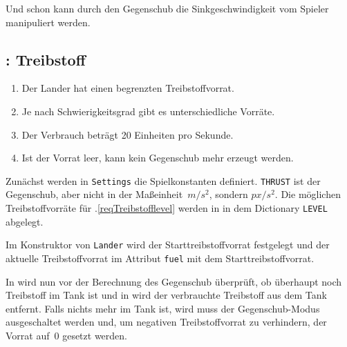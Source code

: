 
Und schon kann durch den Gegenschub die Sinkgeschwindigkeit vom Spieler manipuliert werden.

\subsection{: Treibstoff}

\begin{enumerate}
	\item Der Lander hat einen begrenzten Treibstoffvorrat.\label{reqTreibstoffvorrat}
	\item Je nach Schwierigkeitsgrad gibt es unterschiedliche Vorräte.\label{reqTreibstofflevel}
	\item Der Verbrauch beträgt 20 Einheiten pro Sekunde.\label{reqTreibstoffverbrauch}
	\item Ist der Vorrat leer, kann kein Gegenschub mehr erzeugt werden.\label{reqTreibstoffende}
\end{enumerate}
\er

Zunächst werden in \texttt{Settings} die Spielkonstanten definiert. \texttt{THRUST} ist der Gegenschub, aber nicht in der Maßeinheit~$\unit{m/s^2}$, sondern $\unit{px/s^2}$. Die möglichen Treibstoffvorräte für .\ref{reqTreibstofflevel} werden in  in dem Dictionary \texttt{LEVEL} abgelegt.



Im Konstruktor von \texttt{Lander} wird der Starttreibstoffvorrat festgelegt und der aktuelle Treibstoffvorrat im Attribut \texttt{fuel} mit dem Starttreibstoffvorrat.


In  wird nun vor der Berechnung des Gegenschub überprüft, ob überhaupt noch Treibstoff im Tank ist und in  wird der verbrauchte Treibstoff aus dem Tank entfernt. Falls nichts mehr im Tank ist, wird muss der Gegenschub-Modus ausgeschaltet werden und, um negativen Treibstoffvorrat zu verhindern, der Vorrat auf~$0$ gesetzt werden.

